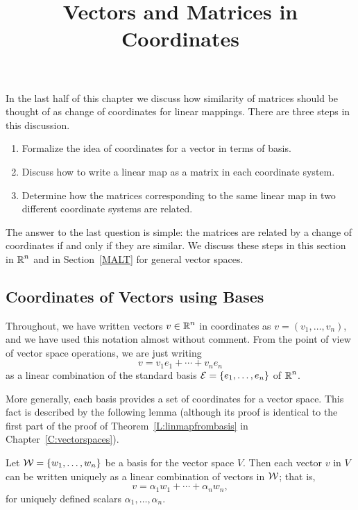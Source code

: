 \documentclass{ximera}
\title{Vectors and Matrices in Coordinates}
\begin{document}
\begin{abstract}
\end{abstract}
\maketitle

  \label{S:coordinates}

In the last half of this chapter we discuss how similarity of matrices should
be thought of as change of coordinates for linear mappings.  There are three
steps in this discussion.
\begin{enumerate}
\item 	Formalize the idea of coordinates for a vector in terms of basis.
\item	Discuss how to write a linear map as a matrix in each coordinate
	system.
\item	Determine how the matrices corresponding to the same linear map in
	two different coordinate systems are related.
 \end{enumerate}
The answer to the last question is simple: the matrices are related by a
change of coordinates if and only if they are similar.  We discuss these
steps in this section in $\mbox{$\Bbb{R}$}^n$ and in Section~\ref{MALT} for general vector
spaces.


\subsection*{Coordinates of Vectors using Bases}

Throughout, we have written vectors $v\in\mbox{$\Bbb{R}$}^n$ in coordinates as
$v = (v_1,\ldots,v_n)$, and we have used this notation almost without
comment.  From the point of view of vector space operations, we are
just writing
\[
v = v_1e_1 + \cdots + v_ne_n
\]
as a linear combination  of the standard basis
${\cal E} = \{e_1,\ldots,e_n\}$ of $\mbox{$\Bbb{R}$}^n$.

More generally, each basis provides a set of coordinates for a vector space.
This fact is described by the following lemma (although its proof is identical 
to the first part of the proof of Theorem~\ref{L:linmapfrombasis} in 
Chapter~\ref{C:vectorspaces}).

\begin{lemma} \label{L:coordinates}
Let ${\cal W}=\{w_1,\ldots,w_n\}$ be a basis for the vector space $V$.  Then
each vector $v$ in $V$ can be written uniquely as a linear combination of
vectors in ${\cal W}$; that is,
\[
v = \alpha_1w_1 +\cdots + \alpha_nw_n,
\]
for uniquely defined scalars $\alpha_1,\ldots,\alpha_n$.
\end{lemma}
\end{document}
